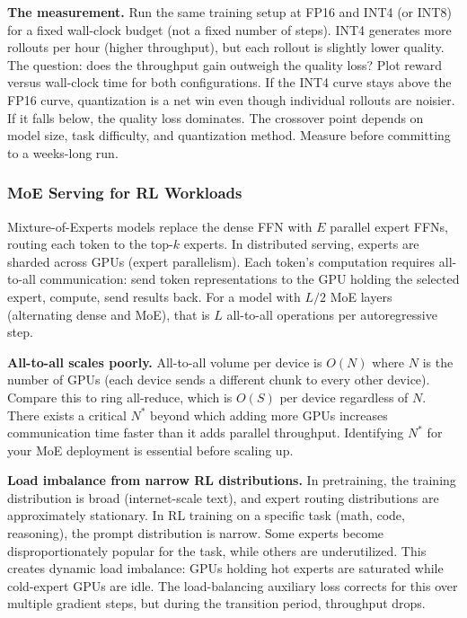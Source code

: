 \textbf{The measurement.} Run the same training setup at FP16 and INT4 (or INT8) for a fixed wall-clock budget (not a fixed number of steps). INT4 generates more rollouts per hour (higher throughput), but each rollout is slightly lower quality. The question: does the throughput gain outweigh the quality loss? Plot reward versus wall-clock time for both configurations. If the INT4 curve stays above the FP16 curve, quantization is a net win even though individual rollouts are noisier. If it falls below, the quality loss dominates. The crossover point depends on model size, task difficulty, and quantization method. Measure before committing to a weeks-long run.

\subsubsection*{MoE Serving for RL Workloads}

Mixture-of-Experts models replace the dense FFN with $E$ parallel expert FFNs, routing each token to the top-$k$ experts. In distributed serving, experts are sharded across GPUs (expert parallelism). Each token's computation requires all-to-all communication: send token representations to the GPU holding the selected expert, compute, send results back. For a model with $L/2$ MoE layers (alternating dense and MoE), that is $L$ all-to-all operations per autoregressive step.

\textbf{All-to-all scales poorly.} All-to-all volume per device is $O(N)$ where $N$ is the number of GPUs (each device sends a different chunk to every other device). Compare this to ring all-reduce, which is $O(S)$ per device regardless of $N$. There exists a critical $N^*$ beyond which adding more GPUs increases communication time faster than it adds parallel throughput. Identifying $N^*$ for your MoE deployment is essential before scaling up.

\textbf{Load imbalance from narrow RL distributions.} In pretraining, the training distribution is broad (internet-scale text), and expert routing distributions are approximately stationary. In RL training on a specific task (math, code, reasoning), the prompt distribution is narrow. Some experts become disproportionately popular for the task, while others are underutilized. This creates dynamic load imbalance: GPUs holding hot experts are saturated while cold-expert GPUs are idle. The load-balancing auxiliary loss corrects for this over multiple gradient steps, but during the transition period, throughput drops.

